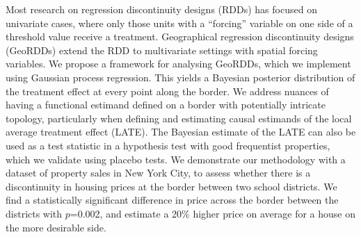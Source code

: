 Most research on regression discontinuity designs (RDDs) has focused on univariate cases, where only those units with a ``forcing'' variable on one side of a threshold value receive a treatment.
Geographical regression discontinuity designs (GeoRDDs) extend the RDD to multivariate settings with spatial forcing variables.
We propose a framework for analysing GeoRDDs, which we implement using Gaussian process regression. 
This yields a Bayesian posterior distribution of the treatment effect at every point along the border.
We address nuances of having a functional estimand defined on a border with potentially intricate topology, particularly when defining and estimating causal estimands of the local average treatment effect (LATE).
The Bayesian estimate of the LATE can also be used as a test statistic
in a hypothesis test with good frequentist properties, 
which we validate using placebo tests.
We demonstrate our methodology with a dataset of property sales in New York City,
to assess whether there is a discontinuity in housing prices at the border between two school districts.
We find a statistically significant difference in price across the border between the districts with \(p\)=0.002, and estimate a 20\%  higher price on average for a house on the more desirable side.
